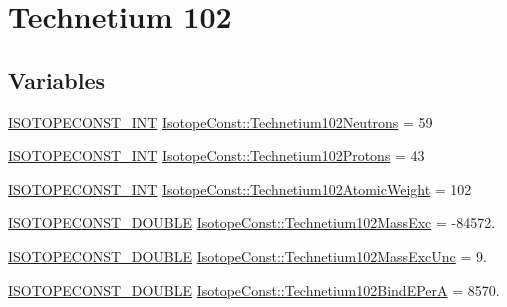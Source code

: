 \hypertarget{group___isotope_const-_technetium-_tc102}{}\section{Technetium 102}
\label{group___isotope_const-_technetium-_tc102}
\subsection*{Variables}
\begin{DoxyCompactItemize}
\item 
\mbox{\hyperlink{group___isotope_const-_macros_ga5f18360b3e99483a35c32d789e62621c}{I\+S\+O\+T\+O\+P\+E\+C\+O\+N\+S\+T\+\_\+\+I\+NT}} \mbox{\hyperlink{group___isotope_const-_technetium-_tc102_ga271cad279b449aa45f7625dc1ae2fcb6}{Isotope\+Const\+::\+Technetium102\+Neutrons}} = 59
\item 
\mbox{\hyperlink{group___isotope_const-_macros_ga5f18360b3e99483a35c32d789e62621c}{I\+S\+O\+T\+O\+P\+E\+C\+O\+N\+S\+T\+\_\+\+I\+NT}} \mbox{\hyperlink{group___isotope_const-_technetium-_tc102_ga1645b2a00ae710398822e581a4e57d05}{Isotope\+Const\+::\+Technetium102\+Protons}} = 43
\item 
\mbox{\hyperlink{group___isotope_const-_macros_ga5f18360b3e99483a35c32d789e62621c}{I\+S\+O\+T\+O\+P\+E\+C\+O\+N\+S\+T\+\_\+\+I\+NT}} \mbox{\hyperlink{group___isotope_const-_technetium-_tc102_gaed80ba112954922d21f88d3f33218015}{Isotope\+Const\+::\+Technetium102\+Atomic\+Weight}} = 102
\item 
\mbox{\hyperlink{group___isotope_const-_macros_ga8f45a7272ce02c0b4c65c44636ed719a}{I\+S\+O\+T\+O\+P\+E\+C\+O\+N\+S\+T\+\_\+\+D\+O\+U\+B\+LE}} \mbox{\hyperlink{group___isotope_const-_technetium-_tc102_ga883e3044f20653285ab3f20e1bcb4bf0}{Isotope\+Const\+::\+Technetium102\+Mass\+Exc}} = -\/84572.
\item 
\mbox{\hyperlink{group___isotope_const-_macros_ga8f45a7272ce02c0b4c65c44636ed719a}{I\+S\+O\+T\+O\+P\+E\+C\+O\+N\+S\+T\+\_\+\+D\+O\+U\+B\+LE}} \mbox{\hyperlink{group___isotope_const-_technetium-_tc102_gadd7a0619b7ad38c081125095e1e59e2f}{Isotope\+Const\+::\+Technetium102\+Mass\+Exc\+Unc}} = 9.
\item 
\mbox{\hyperlink{group___isotope_const-_macros_ga8f45a7272ce02c0b4c65c44636ed719a}{I\+S\+O\+T\+O\+P\+E\+C\+O\+N\+S\+T\+\_\+\+D\+O\+U\+B\+LE}} \mbox{\hyperlink{group___isotope_const-_technetium-_tc102_ga36447595668ea984a6d561a5f54c14c3}{Isotope\+Const\+::\+Technetium102\+Bind\+E\+PerA}} = 8570.
\item 

\end{DoxyCompactItemize}

